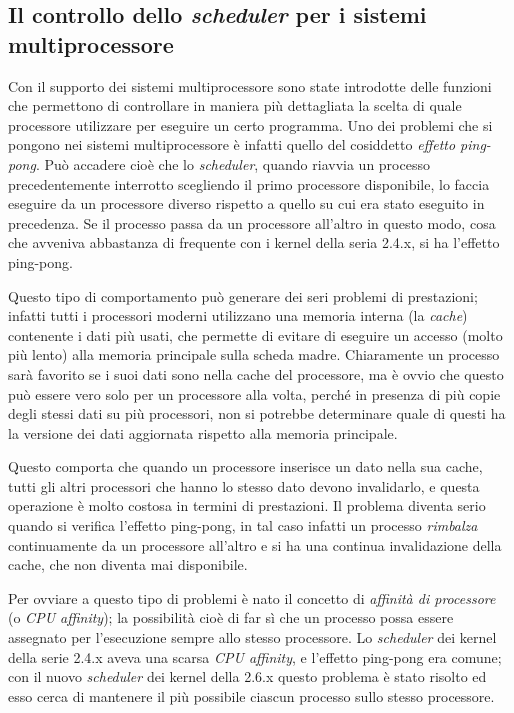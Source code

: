 \subsection{Il controllo dello \textit{scheduler} per i sistemi
  multiprocessore}
\label{sec:proc_sched_multiprocess}


Con il supporto dei sistemi multiprocessore sono state introdotte delle
funzioni che permettono di controllare in maniera più dettagliata la scelta di
quale processore utilizzare per eseguire un certo programma. Uno dei problemi
che si pongono nei sistemi multiprocessore è infatti quello del cosiddetto
\textsl{effetto ping-pong}. Può accadere cioè che lo \textit{scheduler},
quando riavvia un processo precedentemente interrotto scegliendo il primo
processore disponibile, lo faccia eseguire da un processore diverso rispetto a
quello su cui era stato eseguito in precedenza. Se il processo passa da un
processore all'altro in questo modo, cosa che avveniva abbastanza di frequente
con i kernel della seria 2.4.x, si ha l'effetto ping-pong.

Questo tipo di comportamento può generare dei seri problemi di prestazioni;
infatti tutti i processori moderni utilizzano una memoria interna (la
\textit{cache}) contenente i dati più usati, che permette di evitare di
eseguire un accesso (molto più lento) alla memoria principale sulla scheda
madre.  Chiaramente un processo sarà favorito se i suoi dati sono nella cache
del processore, ma è ovvio che questo può essere vero solo per un processore
alla volta, perché in presenza di più copie degli stessi dati su più
processori, non si potrebbe determinare quale di questi ha la versione dei
dati aggiornata rispetto alla memoria principale.

Questo comporta che quando un processore inserisce un dato nella sua cache,
tutti gli altri processori che hanno lo stesso dato devono invalidarlo, e
questa operazione è molto costosa in termini di prestazioni. Il problema
diventa serio quando si verifica l'effetto ping-pong, in tal caso infatti un
processo \textsl{rimbalza} continuamente da un processore all'altro e si ha
una continua invalidazione della cache, che non diventa mai disponibile.


Per ovviare a questo tipo di problemi è nato il concetto di \textsl{affinità
  di processore} (o \textit{CPU affinity}); la possibilità cioè di far sì che
un processo possa essere assegnato per l'esecuzione sempre allo stesso
processore. Lo \textit{scheduler} dei kernel della serie 2.4.x aveva una
scarsa \textit{CPU affinity}, e l'effetto ping-pong era comune; con il nuovo
\textit{scheduler} dei kernel della 2.6.x questo problema è stato risolto ed
esso cerca di mantenere il più possibile ciascun processo sullo stesso
processore.

